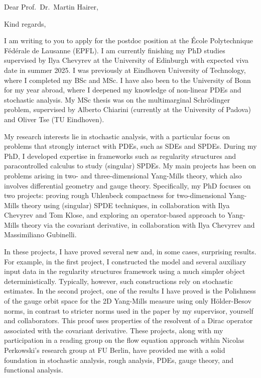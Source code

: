 \documentclass[12pt,a4paper]{moderncv}
\begin{document}
\date{\today}
\opening{Dear Prof.\ Dr.\  Martin Hairer,}
\closing{Kind regards,\vspace{0em}}


\makelettertitle
\justifying
I am writing to you to apply for the postdoc position at the École Polytechnique Fédérale de Lausanne (EPFL). I am currently finishing my PhD studies supervised by Ilya Chevyrev at the University of Edinburgh with expected viva date in summer 2025. I was previously at Eindhoven University of Technology, where I completed my BSc and MSc. I have also been to the University of Bonn for my year abroad, where I deepened my knowledge of non-linear PDEs and stochastic analysis. My MSc thesis was on the multimarginal Schrödinger problem, supervised by Alberto Chiarini (currently at the University of Padova) and Oliver Tse (TU Eindhoven).

My research interests lie in stochastic analysis, with a particular focus on problems that strongly interact with PDEs, such as SDEs and SPDEs. During my PhD, I developed expertise in frameworks such as regularity structures and paracontrolled calculus to study (singular) SPDEs. My main projects has been on problems arising in two- and three-dimensional Yang-Mills theory, which also involves differential geometry and gauge theory. Specifically, my PhD focuses on two projects: proving rough Uhlenbeck compactness for two-dimensional Yang-Mills theory using (singular) SPDE techniques, in collaboration with  Ilya Chevyrev and Tom Klose, and exploring an operator-based approach to Yang-Mills theory via the covariant derivative, in collaboration with Ilya Chevyrev and Massimiliano Gubinelli. 


In these projects, I have proved several new and, in some cases, surprising results. For example, in the first project, I constructed the model and several auxiliary input data in the regularity structures framework using a much simpler object deterministically. Typically, however, such constructions rely on stochastic estimates. In the second project, one of the results I have proved is the Polishness of the gauge orbit space for the 2D Yang-Mills measure using only Hölder-Besov norms, in contrast to stricter norms used in the paper by my supervisor, yourself and collaborators. This proof uses properties of the resolvent of a Dirac operator associated with the covariant derivative. These projects, along with my participation in a reading group on the flow equation approach within Nicolas Perkowski’s research group at FU Berlin, have provided me with a solid foundation in stochastic analysis, rough analysis, PDEs, gauge theory, and functional analysis.
\end{document}
